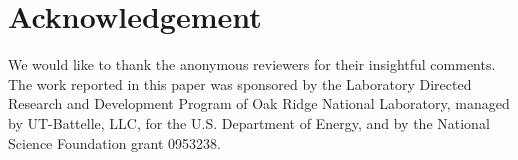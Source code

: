 \section{Acknowledgement}
\label{acknowledgement}
We would like to thank the anonymous reviewers for their insightful comments. The work reported in this paper was sponsored by the Laboratory Directed Research and Development Program of Oak Ridge National Laboratory, managed by UT-Battelle, LLC, for the U.S. Department of Energy, and by the National Science Foundation grant 0953238.
